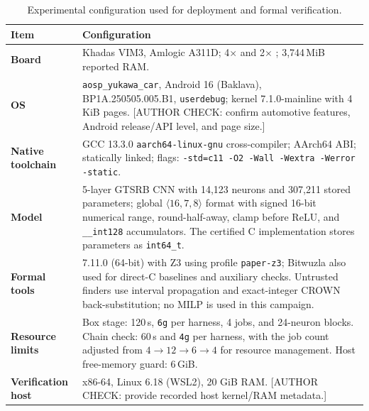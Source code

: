 \begin{table}[h]
\centering
\caption{Experimental configuration used for deployment and formal verification.}
\label{tab:setup}
\scriptsize
\renewcommand{\arraystretch}{1.12}
\setlength{\tabcolsep}{4pt}
\begin{tabularx}{\columnwidth}{@{}>{\bfseries}p{}X@{}}
\toprule
\textbf{Item} & \textbf{Configuration} \\
\midrule

Board &
Khadas VIM3, Amlogic A311D; 4$\times$ \Aseven{} and
2$\times$ \Athree{}; 3,744\,MiB reported RAM. \\

\addlinespace[1pt]
OS &
\AAOS{} \texttt{aosp\_yukawa\_car}, Android 16 (Baklava),
BP1A.250505.005.B1, \texttt{userdebug}; kernel
7.1.0-mainline with 4\,KiB pages. [AUTHOR CHECK: confirm automotive features, Android release/API level, and page size.] \\

\addlinespace[1pt]
Native toolchain &
GCC 13.3.0 \texttt{aarch64-linux-gnu} cross-compiler;
AArch64 ABI; statically linked; flags:
\texttt{-std=c11 -O2 -Wall -Wextra -Werror -static}. \\

\addlinespace[1pt]
Model &
5-layer GTSRB CNN with 14,123 neurons and 307,211 stored
parameters; global $\langle16,7,8\rangle$ format with signed 16-bit numerical range,
round-half-away, clamp before ReLU, and
\texttt{\_\_int128} accumulators. The certified C
implementation stores parameters as \texttt{int64\_t}. \\

\addlinespace[1pt]
Formal tools &
\ESBMC{} 7.11.0 (64-bit) with Z3 using profile
\texttt{paper-z3}; Bitwuzla also used for direct-C
baselines and auxiliary checks. Untrusted finders use interval propagation and
exact-integer CROWN back-substitution; no MILP is used in
this campaign. \\

\addlinespace[1pt]
Resource limits &
Box stage: 120\,s, \texttt{6g} per harness, 4 jobs, and 24-neuron blocks.
Chain check: 60\,s and \texttt{4g} per harness, with the job count
adjusted from $4\!\rightarrow\!12\!\rightarrow\!6\!\rightarrow\!4$
for resource management. Host free-memory guard: 6\,GiB. \\

\addlinespace[1pt]
Verification host &
x86-64, Linux 6.18 (WSL2), 20 GiB RAM. [AUTHOR CHECK: provide recorded host kernel/RAM metadata.] \\

\bottomrule
\end{tabularx}
\end{table}



